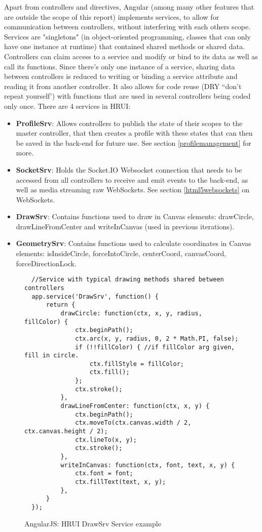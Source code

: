 Apart from controllers and directives, Angular (among many other features that are outside the scope of this report) implements 
services, to allow for communication between controllers, without interfering with each others scope. Services are "singletons" (in 
object-oriented programming, classes that can only have one instance at runtime) that contained shared methods or shared data. 
Controllers can claim access to a service and modify or bind to its data as well as call its functions. Since there's only one instance 
of a service, sharing data between controllers is reduced to writing or binding a service attribute and reading it from another 
controller. It also allows for code reuse (DRY ``don't repeat yourself') with functions that are used in several controllers being coded 
only once. There are 4 services in HRUI:
\begin{itemize}
  \item \textbf{ProfileSrv}: Allows controllers to publish the state of their scopes to the master controller, that then creates a
  profile with these states that can then be saved in the back-end for future use. See section \ref{profilemanagement} for more.
  \item \textbf{SocketSrv}: Holds the Socket.IO Websocket connection that needs to be accessed from all controllers to receive and emit
  events to the back-end, as well as media streaming raw WebSockets. See section \ref{html5websockets} on WebSockets.
  \item \textbf{DrawSrv}: Contains functions used to draw in Canvas elements: drawCircle, drawLineFromCenter and writeInCanvas (used in
  previous iterations).
  \item \textbf{GeometrySrv}: Contains functions used to calculate coordinates in Canvas elements: isInsideCircle, forceIntoCircle,
  centerCoord, canvasCoord, forceDirectionLock.
\end{itemize}
  \begin{figure}[H]
  \centering
  \captionsetup{justification=centering}
  \begin{verbatim}
  //Service with typical drawing methods shared between controllers
  app.service('DrawSrv', function() {
      return {
          drawCircle: function(ctx, x, y, radius, fillColor) {
              ctx.beginPath();
              ctx.arc(x, y, radius, 0, 2 * Math.PI, false);
              if (!!fillColor) { //if fillColor arg given, fill in circle.
                  ctx.fillStyle = fillColor;
                  ctx.fill();
              };
              ctx.stroke();
          },
          drawLineFromCenter: function(ctx, x, y) {
              ctx.beginPath();
              ctx.moveTo(ctx.canvas.width / 2, ctx.canvas.height / 2);
              ctx.lineTo(x, y);
              ctx.stroke();
          },
          writeInCanvas: function(ctx, font, text, x, y) {
              ctx.font = font;
              ctx.fillText(text, x, y);
          },
      }
  });
  \end{verbatim}
  \caption{AngularJS: HRUI DrawSrv Service example}
  \end{figure}

